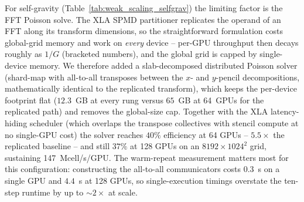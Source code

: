 For self-gravity (Table~\ref{tab:weak_scaling_selfgrav}) the limiting
factor is the FFT Poisson solve.  The XLA SPMD partitioner replicates the
operand of an FFT along its transform dimensions, so the straightforward
formulation costs global-grid memory and work on \emph{every} device --
per-GPU throughput then decays roughly as $1/G$ (bracketed numbers), and
the global grid is capped by single-device memory.  We therefore added a
slab-decomposed distributed Poisson solver (shard-map with all-to-all
transposes between the $x$- and $y$-pencil decompositions, mathematically
identical to the replicated transform), which keeps the per-device
footprint flat ($12.3$~GB at every rung versus $65$~GB at 64~GPUs for the
replicated path) and removes the global-size cap.  Together with the XLA
latency-hiding scheduler (which overlaps the transpose collectives with
stencil compute at no single-GPU cost) the solver reaches $40\%$
efficiency at 64 GPUs -- $5.5\times$ the replicated baseline -- and still
$37\%$ at 128 GPUs on an $8192\times1024^{2}$ grid, sustaining
147~Mcell/s/GPU.  The warm-repeat measurement matters most for this
configuration: constructing the all-to-all communicators costs $0.3$~s on
a single GPU and $4.4$~s at 128 GPUs, so single-execution timings
overstate the ten-step runtime by up to $\sim\!2\times$ at scale.

